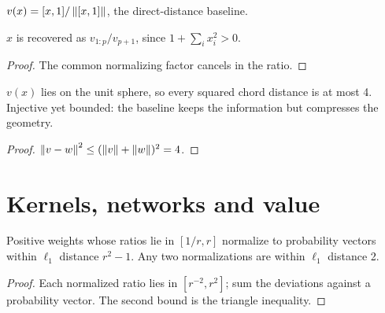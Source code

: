 \begin{definition}\label{def:geometry-chord}
  \leanok
  $v(x)=[x,1]/\left\lVert[x,1]\right\rVert$, the direct-distance baseline.
\end{definition}

\begin{lemma}\label{thm:geometry-chord-injective}
  \leanok
  $x$ is recovered as $v_{1:p}/v_{p+1}$, since $1+\sum_ix_i^2>0$.
\end{lemma}
\begin{proof}\leanok
  The common normalizing factor cancels in the ratio.
\end{proof}

\begin{lemma}\label{thm:geometry-chord-bounded}
  \leanok
  $v(x)$ lies on the unit sphere, so every squared chord distance is at most 4.
  Injective yet bounded: the baseline keeps the information but compresses the
  geometry.
\end{lemma}
\begin{proof}\leanok
  $\left\lVert v-w\right\rVert^2\le(\left\lVert v\right\rVert+\left\lVert w\right\rVert)^2=4$.
\end{proof}

\section{Kernels, networks and value}\label{sec:bp-network}

\begin{lemma}\label{thm:kernel-normalized}
  \leanok
  Positive weights whose ratios lie in $[1/r,r]$ normalize to probability
  vectors within $\ell_1$ distance $r^2-1$. Any two normalizations are within
  $\ell_1$ distance 2.
\end{lemma}
\begin{proof}\leanok
  Each normalized ratio lies in $[r^{-2},r^2]$; sum the deviations against a
  probability vector. The second bound is the triangle inequality.
\end{proof}

